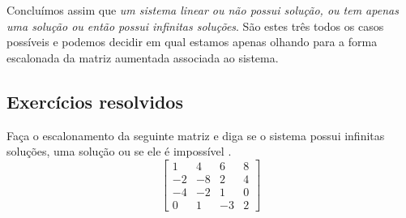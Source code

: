 Concluímos assim que \textit{um sistema linear ou não possui solução, ou tem apenas uma solução ou então possui infinitas soluções}. São estes três todos os casos possíveis e podemos decidir em qual estamos apenas olhando para a forma escalonada da matriz aumentada associada ao sistema.

\subsection*{Exercícios resolvidos}

\construirExeresol

\begin{exeresol}
Faça o escalonamento da seguinte matriz e diga se o sistema possui infinitas soluções, uma solução ou se ele é impossível .
\begin{equation}
 \left[
  \begin{array}{ccc|c}
    1 & 4 & 6 & 8 \\
    -2 & -8 & 2 & 4 \\
    -4 & -2 & 1 & 0 \\
    0 & 1 & -3 & 2
  \end{array}
\right]
\end{equation}
\end{exeresol}
